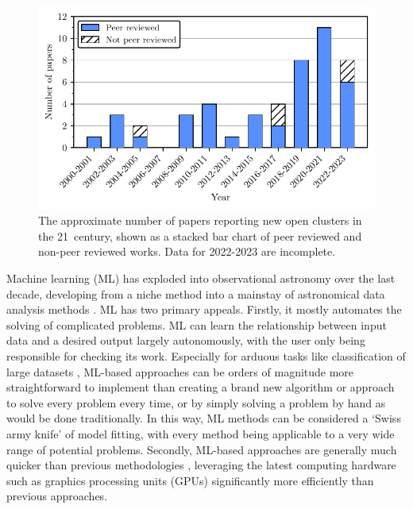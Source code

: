 \begin{figure}[t]
	\includegraphics[width=\textwidth]{fig/c1/papers.pdf}
	\caption[The approximate number of papers reporting new open clusters in the 21\first\ century]{The approximate number of papers reporting new open clusters in the 21\first\ century, shown as a stacked bar chart of peer reviewed and non-peer reviewed works. Data for 2022-2023 are incomplete.}
	\label{fig:intro:history:papers}
\end{figure}

Machine learning (ML) has exploded into observational astronomy over the last decade, developing from a niche method into a mainstay of astronomical data analysis methods \citep{ivezic_statistics_data_2020}. ML has two primary appeals. Firstly, it mostly automates the solving of complicated problems. ML can learn the relationship between input data and a desired output largely autonomously, with the user only being responsible for checking its work. Especially for arduous tasks like classification of large datasets \citep[e.g.][]{killestein_transient-optimised_2021}, ML-based approaches can be orders of magnitude more straightforward to implement than creating a brand new algorithm or approach to solve every problem every time, or by simply solving a problem by hand as would be done traditionally. In this way, ML methods can be considered a `Swiss army knife' of model fitting, with every method being applicable to a very wide range of potential problems. Secondly, ML-based approaches are generally much quicker than previous methodologies \citep{hunt_improving_2021}, leveraging the latest computing hardware such as graphics processing units (GPUs) significantly more efficiently than previous approaches.

